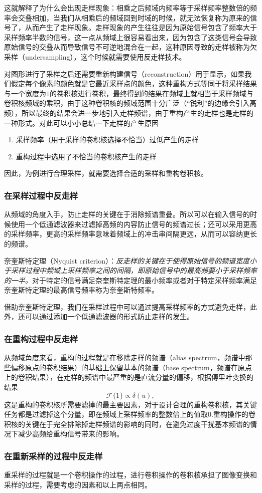 \documentclass{ctexart}
\begin{document}
	这就解释了为什么会出现走样现象：相乘之后频域内频率等于采样频率整数倍的频率会交叠相加，当我们从相乘后的频域回到时域的时候，就无法恢复称为原来的信号了，从而产生了走样现象。走样现象的产生往往是因为原始信号包含了频率大于采样频率半数的信号，这一点从频域上很容易看出来，因为包含了这类信号会导致原始信号的交叠从而导致信号不可逆地混合在一起，这种原因导致的走样被称为欠采样（undersampling），这个时候就需要使用反走样技术。

	对图形进行了采样之后还需要重新构建信号（reconstruction）用于显示，如果我们假定每个像素的颜色就是它最近采样点的颜色，这种重构方式等同于将采样结果与一个宽度为$1$的卷积核进行卷积，最终得到的结果在频域上就相当于采样频域与卷积核频域的乘积，由于这种卷积核的频域范围十分广泛（“锐利”的边缘会引入高频），所以最终的结果会进一步地引入走样频谱，由于重构产生的走样也是走样的一种形式。对此可以小小总结一下走样的产生原因
	\begin{enumerate}
		\item 采样频率（用于采样的卷积核选择不恰当）过低产生的走样
		\item 重构过程中选用了不恰当的卷积核产生的走样
	\end{enumerate}
	因此，为例进行合理采样，就需要选择合适的采样和重构卷积核。

	\subsubsection{在采样过程中反走样}

	从频域的角度入手，防止走样的关键在于消除频谱重叠。所以可以在输入信号的时候使用一个低通滤波器来过滤掉高频的内容防止信号的频谱过长；还可以采用更高的采样频率，更高的采样频率意味着频域上的冲击串间隔更远，从而可以容纳更长的频谱。

	奈奎斯特定理（Nyquist criterion）：\emph{反走样的关键在于使得原始信号的频谱宽度小于采样过程中频域上采样频率之间的间隔，即原始信号中的最高频要小于采样频率的一半。}对于特定的信号满足奈奎斯特定理的最小频率或者对于特定采样频率满足奈奎斯特定理的最高信号频率称为奈奎斯特频率。

	借助奈奎斯特定理，我们在采样过程中可以通过提高采样频率的方式避免走样，此外，还可以通过添加一个低通滤波器的形式防止走样的发生。

	\subsubsection{在重构过程中反走样}
	从频域角度来看，重构的过程就是在移除走样的频谱（alias spectrum，频谱中那些偏移原点的卷积结果）的基础上保留基本的频谱（base spectrum，频谱在原点上的卷积结果），在走样的频谱中最严重的是直流分量的偏移，根据傅里叶变换的结果
	\[ \mathcal F\{1\}\propto \delta(u), \]
	这是重构的卷积核所需要滤掉的最主要因素，对于设计合理的重构卷积核，其关键任务都是过滤掉这个分量，即在频域上采样频率的整数倍上的值取$0$.重构操作的卷积核的关键在于完全排除掉走样频谱的影响的同时，在避免过度干扰基本频谱的情况下减少高频给重构信号带来的影响。

	\subsubsection{在重新采样的过程中反走样}
	重采样的过程就是一个卷积操作的过程，进行卷积操作的卷积核承担了图像变换和采样的过程，需要考虑的因素和以上两点相同。
\end{document}
